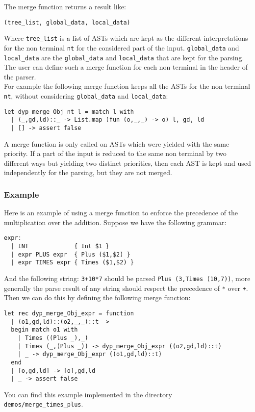\documentclass[12pt]{article}
\begin{document}
{The merge function returns a result like:
\begin{verbatim}
(tree_list, global_data, local_data)
\end{verbatim}
Where \verb|tree_list| is a list of ASTs which are kept as the different interpretations for the non terminal \verb|nt| for the considered part of the input. \verb|global_data| and \verb|local_data| are the \verb|global_data| and \verb|local_data| that are kept for the parsing.\\

The user can define such a merge function for each non terminal in the header of the parser.\\

For example the following merge function keeps all the ASTs for the non terminal \verb|nt|, without considering \verb|global_data| and \verb|local_data|:
\begin{verbatim}
let dyp_merge_Obj_nt l = match l with
  | (_,gd,ld)::_ -> List.map (fun (o,_,_) -> o) l, gd, ld
  | [] -> assert false
\end{verbatim}

A merge function is only called on ASTs which were yielded with the same priority. If a part of the input is reduced to the same non terminal by two different ways but yielding two distinct priorities, then each AST is kept and used independently for the parsing, but they are not merged.

\subsubsection{Example}

Here is an example of using a merge function to enforce the precedence of the multiplication over the addition. Suppose we have the following grammar:
\begin{verbatim}
expr:
  | INT             { Int $1 }
  | expr PLUS expr  { Plus ($1,$2) }
  | expr TIMES expr { Times ($1,$2) }
\end{verbatim}
And the following string: \texttt{3+10*7} should be parsed \texttt{Plus (3,Times (10,7))}, more generally the parse result of any string should respect the precedence of \texttt{*} over \texttt{+}. Then we can do this by defining the following merge function:
\begin{verbatim}
let rec dyp_merge_Obj_expr = function
  | (o1,gd,ld)::(o2,_,_)::t ->
  begin match o1 with
    | Times ((Plus _),_)
    | Times (_,(Plus _)) -> dyp_merge_Obj_expr ((o2,gd,ld)::t)
    | _ -> dyp_merge_Obj_expr ((o1,gd,ld)::t)
  end
  | [o,gd,ld] -> [o],gd,ld
  | _ -> assert false
\end{verbatim}
You can find this example implemented in the directory \verb|demos/merge_times_plus|.\\

}
\end{document}

